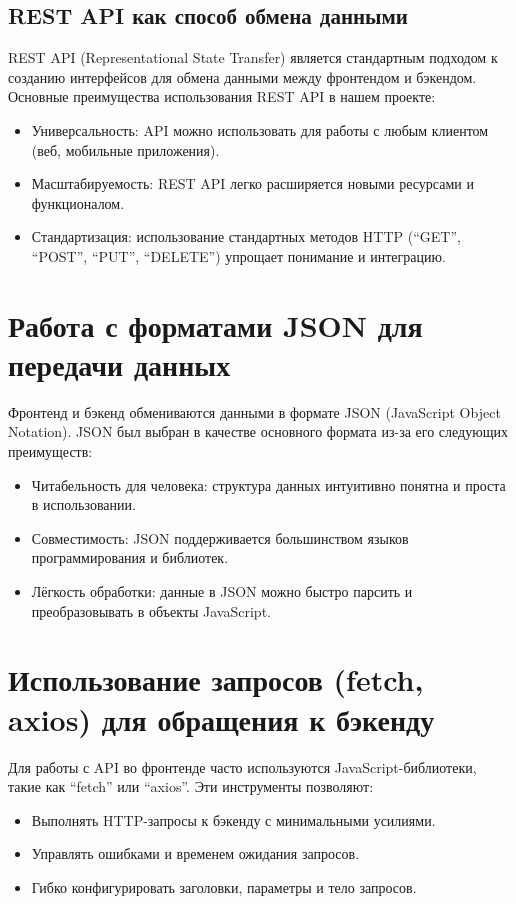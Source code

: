 \subsection*{REST API как способ обмена данными}
REST API (Representational State Transfer) является стандартным подходом к созданию интерфейсов для обмена данными между фронтендом и бэкендом. Основные преимущества использования REST API в нашем проекте:
\begin{itemize}
    \item Универсальность: API можно использовать для работы с любым клиентом (веб, мобильные приложения).
    \item Масштабируемость: REST API легко расширяется новыми ресурсами и функционалом.
    \item Стандартизация: использование стандартных методов HTTP (``GET'', ``POST'', ``PUT'', ``DELETE'') упрощает понимание и интеграцию.
\end{itemize}

\section{Работа с форматами JSON для передачи данных}
Фронтенд и бэкенд обмениваются данными в формате JSON (JavaScript Object Notation). JSON был выбран в качестве основного формата из-за его следующих преимуществ:
\begin{itemize}
    \item Читабельность для человека: структура данных интуитивно понятна и проста в использовании.
    \item Совместимость: JSON поддерживается большинством языков программирования и библиотек.
    \item Лёгкость обработки: данные в JSON можно быстро парсить и преобразовывать в объекты JavaScript.
\end{itemize}

\section{Использование запросов (fetch, axios) для обращения к бэкенду}
Для работы с API во фронтенде часто используются JavaScript-библиотеки, такие как ``fetch'' или ``axios''. Эти инструменты позволяют:
\begin{itemize}
    \item Выполнять HTTP-запросы к бэкенду с минимальными усилиями.
    \item Управлять ошибками и временем ожидания запросов.
    \item Гибко конфигурировать заголовки, параметры и тело запросов.
\end{itemize}

